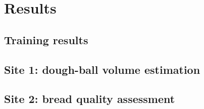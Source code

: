 
\chapter{Results}
\section{Training results}

\section{Site 1: dough-ball volume estimation}

\clearpage
\section{Site 2: bread quality assessment}

